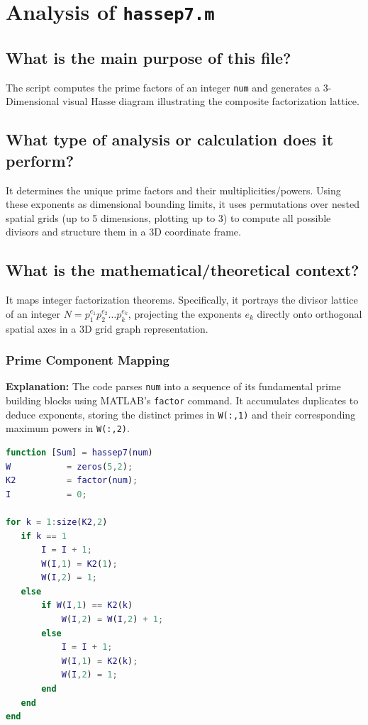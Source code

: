 \newpage
\chapter{Analysis of \texttt{hassep7.m}}

\section{What is the main purpose of this file?}
The script computes the prime factors of an integer \texttt{num} and generates a 3-Dimensional visual Hasse diagram illustrating the composite factorization lattice. 

\section{What type of analysis or calculation does it perform?}
It determines the unique prime factors and their multiplicities/powers. Using these exponents as dimensional bounding limits, it uses permutations over nested spatial grids (up to 5 dimensions, plotting up to 3) to compute all possible divisors and structure them in a 3D coordinate frame.

\section{What is the mathematical/theoretical context?}
It maps integer factorization theorems. Specifically, it portrays the divisor lattice of an integer $N = p_1^{e_1} p_2^{e_2} \dots p_k^{e_k}$, projecting the exponents $e_k$ directly onto orthogonal spatial axes in a 3D grid graph representation.

\subsection{Prime Component Mapping}
\textbf{Explanation:} 
The code parses \texttt{num} into a sequence of its fundamental prime building blocks using MATLAB's \texttt{factor} command. It accumulates duplicates to deduce exponents, storing the distinct primes in \texttt{W(:,1)} and their corresponding maximum powers in \texttt{W(:,2)}.

\begin{lstlisting}[language=Matlab]
function [Sum] = hassep7(num)
W           = zeros(5,2); 
K2          = factor(num);
I           = 0;

for k = 1:size(K2,2)
   if k == 1
       I = I + 1;
       W(I,1) = K2(1);
       W(I,2) = 1;
   else
       if W(I,1) == K2(k)
           W(I,2) = W(I,2) + 1;
       else
           I = I + 1;
           W(I,1) = K2(k);
           W(I,2) = 1;
       end
   end
end
\end{lstlisting}

